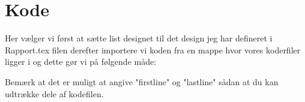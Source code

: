 \documentclass[class=report, crop=false]{standalone}
\begin{document}
    \section{Kode}
    Her vælger vi først at sætte list designet til det design jeg har defineret i Rapport.tex filen derefter importere vi koden fra en mappe hvor vores koderfiler ligger i og dette gør vi på følgende måde:
    \begin{tcblisting}{}
        \lstset{style=codestyle}
        
    \end{tcblisting}
    \noindent Bemærk at det er muligt at angive "firstline" og "lastline" sådan at du kan udtrække dele af kodefilen.
\end{document}
